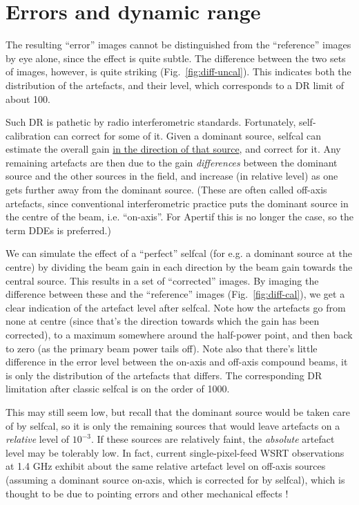 \documentclass[10pt]{article}
\begin{document}
\section{Errors and dynamic range}

The resulting ``error'' images cannot be distinguished from the ``reference'' images by eye alone, since the effect is quite subtle. The difference between the two sets of images, however, is quite striking (Fig.~\ref{fig:diff-uncal}). This indicates both the distribution of the artefacts, and their level, which corresponds to a DR limit of about 100.

Such DR is pathetic by radio interferometric standards. Fortunately, self-calibration can correct for some of it. Given a dominant source, selfcal can estimate the overall gain \underline{in the direction of that source}, and correct for it. Any remaining artefacts are then due to the gain \emph{differences} between the dominant source and the other sources in the field, and increase (in relative level) as one gets further away from the dominant source. (These are often called off-axis artefacts, since conventional interferometric practice puts the dominant source in the centre of the beam, i.e. ``on-axis''. For Apertif this is no longer the case, so the term DDEs is preferred.) 

We can simulate the effect of a ``perfect'' selfcal (for e.g. a dominant source at the centre) by dividing the beam gain in each direction by the beam gain towards the central source. This results in a set of ``corrected'' images. By imaging the difference between these and the ``reference'' images (Fig.~\ref{fig:diff-cal}), we get a clear indication of the artefact level after selfcal. Note how the artefacts go from none at centre (since that's the direction towards which the gain has been corrected), to a maximum somewhere around the half-power point, and then back to zero (as the primary beam power tails off). Note also that there's little difference in the error level between the on-axis and off-axis compound beams, it is only the distribution of the artefacts that differs. The corresponding DR limitation after classic selfcal is on the order of 1000.

This may still seem low, but recall that the dominant source would be taken care of by selfcal, so it is only the remaining sources that would leave artefacts on a \emph{relative} level of $10^{-3}$. If these sources are relatively faint, the \emph{absolute} artefact level may be tolerably low. In fact, current single-pixel-feed WSRT observations at 1.4 GHz exhibit about the same relative artefact level on off-axis sources (assuming a dominant source on-axis, which is corrected for by selfcal), which is thought to be due to pointing errors and other mechanical effects \citep{RRIME3}! 
\end{document}
